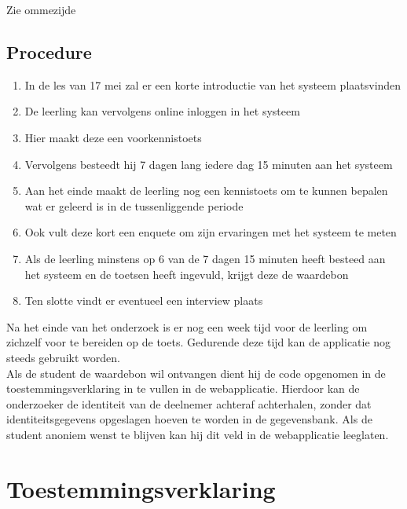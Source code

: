 Zie ommezijde

\clearpage

\subsection{Procedure}

\begin{enumerate}
    \item In de les van 17 mei zal er een korte introductie van het systeem plaatsvinden
    \item De leerling kan vervolgens online inloggen in het systeem
    \item Hier maakt deze een voorkennistoets
    \item Vervolgens besteedt hij 7 dagen lang iedere dag 15 minuten aan het systeem
    \item Aan het einde maakt de leerling nog een kennistoets om te kunnen bepalen wat er geleerd is in de tussenliggende periode
    \item Ook vult deze kort een enquete om zijn ervaringen met het systeem te meten
    \item Als de leerling minstens op 6 van de 7 dagen 15 minuten heeft besteed aan het systeem en de toetsen heeft ingevuld, krijgt deze de waardebon
    \item Ten slotte vindt er eventueel een interview plaats
\end{enumerate}
 
Na het einde van het onderzoek is er nog een week tijd voor de leerling om zichzelf voor te bereiden op de toets. Gedurende deze tijd kan de applicatie nog steeds gebruikt worden. \\[2ex] 
Als de student de waardebon wil ontvangen dient hij de code opgenomen in de toestemmingsverklaring in te vullen in de webapplicatie. Hierdoor kan de onderzoeker de identiteit van de deelnemer achteraf achterhalen, zonder dat identiteitsgegevens opgeslagen hoeven te worden in de gegevensbank. Als de student anoniem wenst te blijven kan hij dit veld in de webapplicatie leeglaten.
 
\cleardoublepage

\section{Toestemmingsverklaring}

